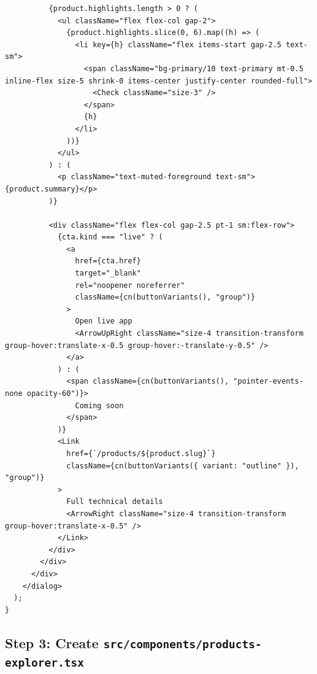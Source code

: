 \documentclass[11pt,a4paper]{article}
\begin{document}
\begin{lstlisting}
          {product.highlights.length > 0 ? (
            <ul className="flex flex-col gap-2">
              {product.highlights.slice(0, 6).map((h) => (
                <li key={h} className="flex items-start gap-2.5 text-sm">
                  <span className="bg-primary/10 text-primary mt-0.5 inline-flex size-5 shrink-0 items-center justify-center rounded-full">
                    <Check className="size-3" />
                  </span>
                  {h}
                </li>
              ))}
            </ul>
          ) : (
            <p className="text-muted-foreground text-sm">{product.summary}</p>
          )}

          <div className="flex flex-col gap-2.5 pt-1 sm:flex-row">
            {cta.kind === "live" ? (
              <a
                href={cta.href}
                target="_blank"
                rel="noopener noreferrer"
                className={cn(buttonVariants(), "group")}
              >
                Open live app
                <ArrowUpRight className="size-4 transition-transform group-hover:translate-x-0.5 group-hover:-translate-y-0.5" />
              </a>
            ) : (
              <span className={cn(buttonVariants(), "pointer-events-none opacity-60")}>
                Coming soon
              </span>
            )}
            <Link
              href={`/products/${product.slug}`}
              className={cn(buttonVariants({ variant: "outline" }), "group")}
            >
              Full technical details
              <ArrowRight className="size-4 transition-transform group-hover:translate-x-0.5" />
            </Link>
          </div>
        </div>
      </div>
    </dialog>
  );
}
\end{lstlisting}

\subsection*{Step 3: Create \texttt{src/components/products-explorer.tsx}}
\end{document}
